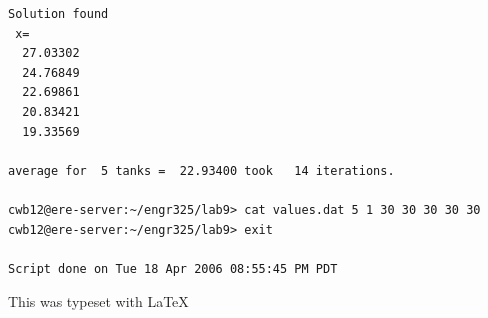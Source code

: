 \documentclass[titlepage,12pt]{article}
\begin{document}
\begin{singlespacing}
\begin{Verbatim}[frame=single]
 Solution found
 x=
  27.03302
  24.76849
  22.69861
  20.83421
  19.33569

average for  5 tanks =  22.93400 took   14 iterations.

cwb12@ere-server:~/engr325/lab9> cat values.dat 5 1 30 30 30 30 30
cwb12@ere-server:~/engr325/lab9> exit

Script done on Tue 18 Apr 2006 08:55:45 PM PDT
\end{Verbatim}
\end{singlespacing}
\noindent This was typeset with \LaTeX
\end{document}

